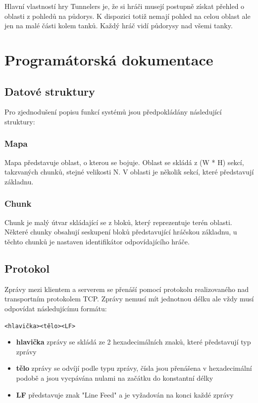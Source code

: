 \documentclass[12pt,a4paper]{article}
\let\oldsection\section
\renewcommand\section{\clearpage\oldsection}
\begin{document}
Hlavní vlastností hry Tunnelers je, že si hráči musejí postupně získat přehled o oblasti z pohledů na půdorys. K dispozici totiž nemají pohled na celou oblast ale jen na malé části kolem tanků. Každý hráč vidí půdorysy nad všemi tanky.


\section{Programátorská dokumentace}
\subsection{Datové struktury}
Pro zjednodušení popisu funkcí systémů jsou předpokládány následující struktury:
\subsubsection*{Mapa}
Mapa představuje oblast, o kterou se bojuje. Oblast se skládá z (W * H) sekcí, takzvaných chunků, stejné velikosti N. V oblasti je několik sekcí, které představují základnu.
\subsubsection*{Chunk}
Chunk je malý útvar skládající se z bloků, který reprezentuje terén oblasti. Některé chunky obsahují seskupení bloků představující hráčskou základnu, u těchto chunků je nastaven identifikátor odpovídajícího hráče.



\subsection{Protokol}
Zprávy mezi klientem a serverem se přenáší pomocí protokolu realizovaného nad transportním protokolem TCP. Zprávy nemusí mít jednotnou délku ale vždy musí odpovídat následujícímu formátu:
\begin{center}
\texttt{<hlavička><tělo><LF>}
\end{center}
\begin{itemize}
\setlength\itemsep{0em}
\item \textbf{hlavička} zprávy se skládá ze 2 hexadecimálních znaků, které představují typ zprávy
\item \textbf{tělo} zprávy se odvíjí podle typu zprávy, čísla jsou přenášena v hexadecimální podobě a jsou vycpávána nulami na začátku do konstantní délky
\item \textbf{LF} představuje znak "Line Feed" a je vyžadován na konci každé zprávy
\end{itemize}
\end{document}
